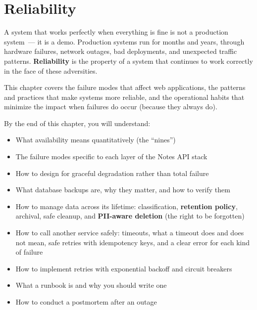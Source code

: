 \setcounter{chapter}{36}
\chapter{Reliability}\label{ch:37-reliability}

\chapterrule

A system that works perfectly when everything is fine is not a production system~--- it is a demo. Production systems run for months and years, through hardware failures, network outages, bad deployments, and unexpected traffic patterns. \textbf{Reliability} is the property of a system that continues to work correctly in the face of these adversities.

This chapter covers the failure modes that affect web applications, the patterns and practices that make systems more reliable, and the operational habits that minimize the impact when failures do occur (because they always do).

\begin{objectives}

By the end of this chapter, you will understand:

\begin{itemize}
\tightlist
\item
  What availability means quantitatively (the ``nines'')
\item
  The failure modes specific to each layer of the Notes API stack
\item
  How to design for graceful degradation rather than total failure
\item
  What database backups are, why they matter, and how to verify them
\item
  How to manage data across its lifetime: classification, \textbf{retention policy}, archival, safe cleanup, and \textbf{PII-aware deletion} (the right to be forgotten)
\item
  How to call another service safely: timeouts, what a timeout does and does not mean, safe retries with idempotency keys, and a clear error for each kind of failure
\item
  How to implement retries with exponential backoff and circuit breakers
\item
  What a runbook is and why you should write one
\item
  How to conduct a postmortem after an outage
\end{itemize}

\end{objectives}

